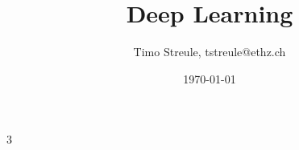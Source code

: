 \documentclass[%
,a4paper
,fontsize=10pt
,landscape
,pagesize
,headinclude
]{scrartcl}
\title{Deep Learning}
\author{Timo Streule, tstreule@ethz.ch}
\date{\today}
\begin{document}
    

    \begin{multicols*}{3}


        \maketitle

        
        
        
        
        
        
        
        
        
        
        
        
        
        
        
        

%        

    \end{multicols*}
\end{document}
